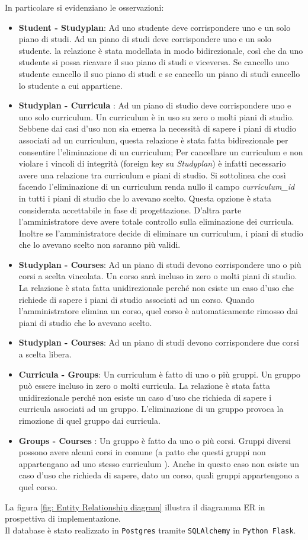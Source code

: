 \documentclass{article}
\begin{document}
In particolare si evidenziano le osservazioni:
\begin{itemize}
\item \textbf{Student - Studyplan}: Ad uno studente deve corrispondere uno e un solo piano di studi. Ad un piano di studi deve corrispondere uno e un solo studente. la relazione è stata modellata in modo bidirezionale, così che da uno studente si possa ricavare il suo piano di studi e viceversa. Se cancello uno studente  cancello il suo piano di studi e se cancello un piano di studi cancello lo studente a cui appartiene.
\item \textbf{Studyplan - Curricula }: Ad un piano di studio deve corrispondere uno e uno solo curriculum. Un curriculum è in uso su zero o molti piani di studio. Sebbene dai casi d'uso non sia emersa la necessità di sapere i piani di studio associati ad un curriculum, questa relazione è stata fatta bidirezionale per consentire l'eliminazione di un curriculum; Per cancellare un curriculum e non violare i vincoli di integrità  (foreign key su \emph{Studyplan}) è infatti necessario avere una relazione tra curriculum e piani di studio. Si sottolinea che così facendo l'eliminazione di un curriculum renda nullo il campo \emph{curriculum\_id} in tutti i piani di studio che lo avevano scelto. Questa opzione è stata considerata accettabile in fase di progettazione. D'altra parte l'amministratore deve avere totale controllo sulla eliminazione dei curricula. Inoltre se l'amministratore decide di eliminare un curriculum, i piani di studio che lo avevano scelto non saranno più validi.
\item \textbf{Studyplan - Courses}:  Ad un piano di studi devono corrispondere uno o più corsi a scelta vincolata. Un corso sarà incluso in zero o molti piani di studio.  La relazione è stata fatta unidirezionale perché non esiste un caso d'uso che richiede di sapere i piani di studio associati ad un corso. Quando l'amministratore elimina un corso, quel corso è automaticamente rimosso dai piani di studio che lo  avevano scelto.
\item \textbf{Studyplan - Courses}:  Ad un piano di studi devono corrispondere due corsi  a scelta libera.
\item \textbf{Curricula - Groups}: Un curriculum è fatto di uno o più gruppi. Un gruppo può essere incluso in zero o molti curricula. La relazione è stata fatta unidirezionale perché non esiste un caso d'uso che richieda di sapere i curricula associati ad un gruppo. L'eliminazione di un gruppo provoca la rimozione di quel gruppo dai curricula.
\item \textbf{Groups - Courses }: Un gruppo è fatto da uno o più corsi. Gruppi diversi possono avere alcuni corsi in comune (a patto che questi gruppi non appartengano ad uno stesso curriculum ). Anche in questo caso non esiste un caso d'uso che richieda di sapere, dato un corso, quali gruppi appartengono a quel corso.
\end{itemize}
La figura \ref{fig: Entity Relationship diagram} illustra il diagramma ER in prospettiva di implementazione.\\
Il database è stato realizzato in \texttt{Postgres} tramite \texttt{SQLAlchemy} in \texttt{Python Flask}.
\end{document}
